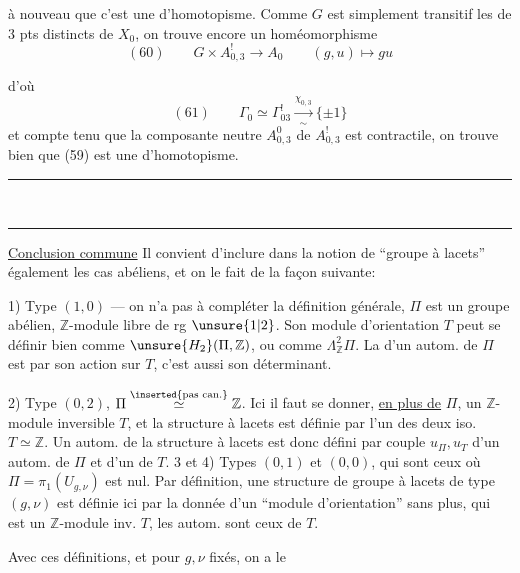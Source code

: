  à nouveau que c'est une  d'homotopisme. Comme $G$ est simplement transitif  les   de $3$ pts distincts de $X_0$, on trouve encore un homéomorphisme
\[
(60)\qquad G\times A^!_{0,3}\longrightarrow A_0\qquad(g,u)\longmapsto gu
\]

d'où
\[
(61)\qquad\Gamma_0\simeq\Gamma^!_{03}\xrightarrow[\sim]{\chi_{0,3}}\{\pm1\}
\]
et compte tenu que la composante neutre $A^0_{0,3}$ de $A^!_{0,3}$ est contractile, on trouve bien  que (59) est une  d'homotopisme.
\begin{center}\rule{1.2cm}{0.25pt}\\[-0.8em]\rule{1.2cm}{0.25pt}\end{center}

\uline{Conclusion commune}  Il convient d'inclure dans la notion de ``groupe à lacets'' également les  cas abéliens, et on le fait de la façon suivante:

1) Type $(1,0)$ --- on n'a pas à compléter la définition générale,  $\Pi$ est un groupe abélien, $\mathbb{Z}$-module libre de rg $\unsure{1|2}$. Son module d'orientation $T$ peut se définir bien comme $\unsure{H_2}(\Pi,\mathbb{Z})$, ou comme $\Lambda^2_{\mathbb{Z}}\Pi$. La   d'un autom. de $\Pi$ est  par son action sur $T$, c'est aussi son déterminant.

2) Type $(0,2)$, $\Pi\overset{\inserted{\text{pas can.}}}{\simeq}\mathbb{Z}$. Ici il faut se donner, \uline{en plus de} $\Pi$, un $\mathbb{Z}$-module inversible $T$, et la structure à lacets est définie par l'un des deux iso. $T\simeq\mathbb{Z}$. Un autom. de la structure à lacets est donc défini par   couple  $u_{\Pi},u_T$ d'un autom. de $\Pi$ et d'un de $T$.
3 et 4) Types $(0,1)$ et $(0,0)$, qui sont ceux où $\Pi=\pi_1(U_{g,\nu})$ est nul. Par définition, une structure de groupe à lacets de type $(g,\nu)$ est définie ici par la donnée d'un ``module d'orientation'' sans plus, qui est un $\mathbb{Z}$-module inv. $T$, les autom. sont ceux de $T$.

Avec ces définitions, et pour $g,\nu$ fixés, on a le

